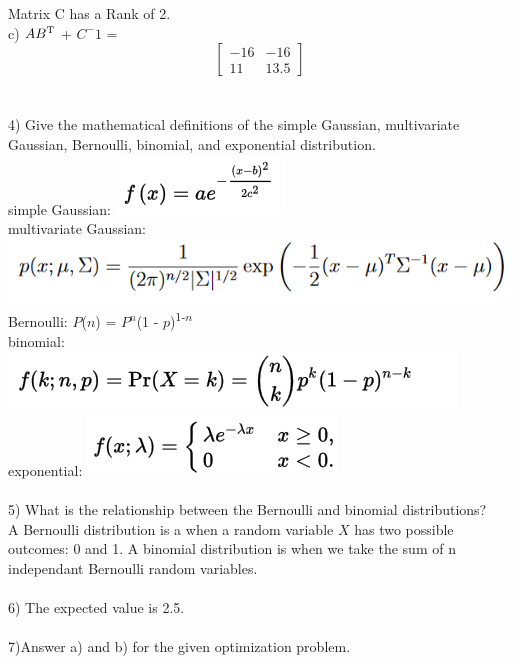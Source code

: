 \documentclass [12pt] {article}
\begin{document}
Matrix C has a Rank of 2.\\

c) $AB\textsuperscript{T}$ + $C^-1$ =\\

\[
	\begin{bmatrix}
	-16 & -16 \\
	11 & 13.5
	\end{bmatrix}
\]\\
\\
4) Give the mathematical definitions of the simple Gaussian, multivariate Gaussian, Bernoulli, binomial, and exponential distribution.\\

simple Gaussian: \includegraphics{Gaussian}\\

multivariate Gaussian:\\
 \includegraphics{multiGaussian}\\

Bernoulli: $P$($n$) = $P^n$(1 - $p$)\textsuperscript{1-$n$}\\

binomial: \includegraphics{binomial}\\

exponential: \includegraphics{exponential}\\
\\

5) What is the relationship between the Bernoulli and binomial distributions?\\

A Bernoulli distribution is a when a random variable $X$ has two possible outcomes: 0 and 1. A binomial distribution is when we take the sum of n independant Bernoulli random variables.\\
\\
6) The expected value is 2.5.\\
\\
7)Answer a) and b) for the given optimization problem.\\
\end{document}
